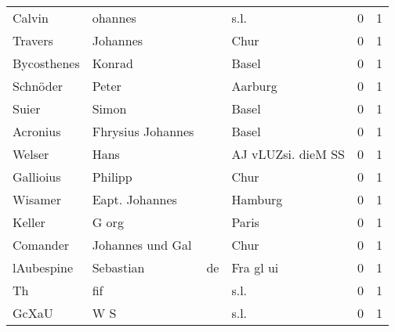 \documentclass[10pt,a4paper,landscape]{article}
\begin{document}
\begin{longtable}{llllrr}
                   Calvin &                            ohannes &             &                                        s.l. &          0 &         1 \\
                  Travers &                           Johannes &             &                                        Chur &          0 &         1 \\
              Bycosthenes &                             Konrad &             &                                       Basel &          0 &         1 \\
                 Schnöder &                              Peter &             &                                     Aarburg &          0 &         1 \\
                    Suier &                              Simon &             &                                       Basel &          0 &         1 \\
                 Acronius &                  Fhrysius Johannes &             &                                       Basel &          0 &         1 \\
                   Welser &                               Hans &             &                          AJ vLUZsi. dieM SS &          0 &         1 \\
                Gallioius &                            Philipp &             &                                        Chur &          0 &         1 \\
                  Wisamer &                     Eapt. Johannes &             &                                     Hamburg &          0 &         1 \\
                   Keller &                              G org &             &                                       Paris &          0 &         1 \\
                 Comander &                   Johannes und Gal &             &                                        Chur &          0 &         1 \\
               lAubespine &                          Sebastian &          de &                                   Fra gl ui &          0 &         1 \\
                       Th &                                fif &             &                                        s.l. &          0 &         1 \\
                    GcXaU &                                W S &             &                                        s.l. &          0 &         1 \\

\end{longtable}
\end{document}
